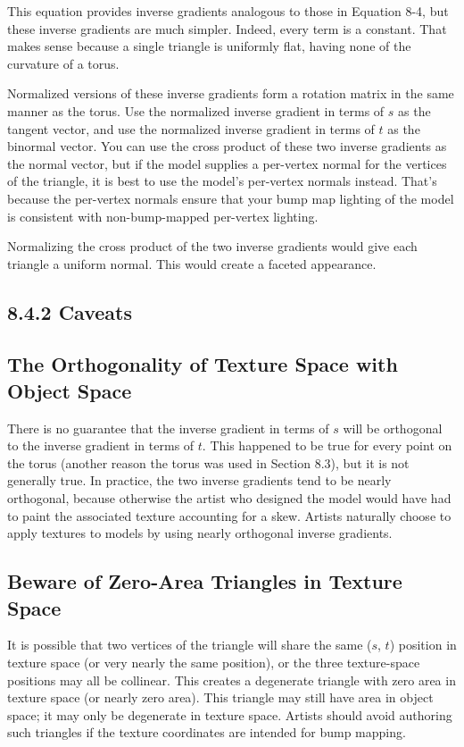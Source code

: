 \documentclass[../main.tex]{subfiles}
\begin{document}
This equation provides inverse gradients analogous to those in Equation 8-4, but these inverse gradients are much simpler. Indeed, every term is a constant. That makes sense because a single triangle is uniformly flat, having none of the curvature of a torus.

Normalized versions of these inverse gradients form a rotation matrix in the same manner as the torus. Use the normalized inverse gradient in terms of $s$ as the tangent vector, and use the normalized inverse gradient in terms of $t$ as the binormal vector. You can use the cross product of these two inverse gradients as the normal vector, but if the model supplies a per-vertex normal for the vertices of the triangle, it is best to use the model's per-vertex normals instead. That's because the per-vertex normals ensure that your bump map lighting of the model is consistent with non-bump-mapped per-vertex lighting.

Normalizing the cross product of the two inverse gradients would give each triangle a uniform normal. This would create a faceted appearance.

\subsection{8.4.2 Caveats}

\subsection*{The Orthogonality of Texture Space with Object Space}

There is no guarantee that the inverse gradient in terms of $s$ will be orthogonal to the inverse gradient in terms of $t$. This happened to be true for every point on the torus (another reason the torus was used in Section 8.3), but it is not generally true. In practice, the two inverse gradients tend to be nearly orthogonal, because otherwise the artist who designed the model would have had to paint the associated texture accounting for a skew. Artists naturally choose to apply textures to models by using nearly orthogonal inverse gradients.

\subsection*{Beware of Zero-Area Triangles in Texture Space}

It is possible that two vertices of the triangle will share the same ($s$, $t$) position in texture space (or very nearly the same position), or the three texture-space positions may all be collinear. This creates a degenerate triangle with zero area in texture space (or nearly zero area). This triangle may still have area in object space; it may only be degenerate in texture space. Artists should avoid authoring such triangles if the texture coordinates are intended for bump mapping.
\end{document}
